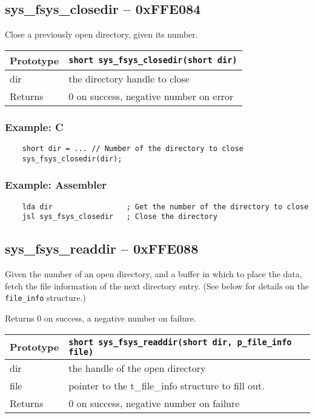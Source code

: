 \subsection*{sys\_fsys\_closedir -- 0xFFE084}
Close a previously open directory, given its number.

\bigskip

\begin{tabular}{|l||l|} \hline
Prototype & \lstinline!short sys_fsys_closedir(short dir)! \\ \hline
dir & the directory handle to close \\ \hline
Returns & 0 on success, negative number on error \\ \hline
\end{tabular}

\subsubsection*{Example: C}
\begin{lstlisting}
    short dir = ... // Number of the directory to close
    sys_fsys_closedir(dir);
\end{lstlisting}

\subsubsection*{Example: Assembler}
\begin{verbatim}
    lda dir                 ; Get the number of the directory to close
    jsl sys_fsys_closedir   ; Close the directory
\end{verbatim}


\subsection*{sys\_fsys\_readdir -- 0xFFE088}
Given the number of an open directory, and a buffer in which to place the data, fetch the file information of the next directory entry. (See below for details on the \verb+file_info+ structure.)

Returns 0 on success, a negative number on failure.

\bigskip

\begin{tabular}{|l||l|} \hline
Prototype & \lstinline!short sys_fsys_readdir(short dir, p_file_info file)! \\ \hline
dir & the handle of the open directory \\ \hline
file & pointer to the t\_file\_info structure to fill out. \\ \hline
Returns & 0 on success, negative number on failure \\ \hline
\end{tabular}

